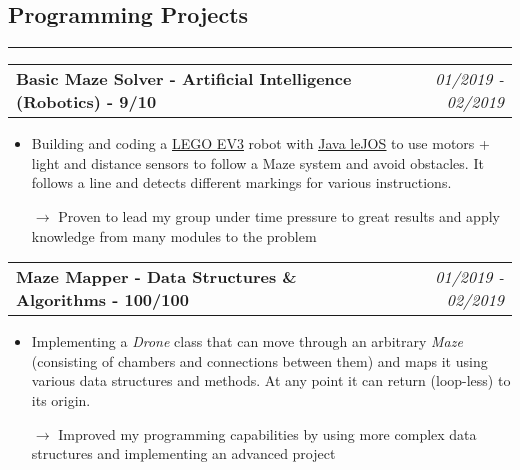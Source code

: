 \documentclass[10pt,letterpaper]{article}
\makeatletter
\newcommand{\headerrow}[2]
{\begin{tabular*}{\linewidth}{l@{\extracolsep{\fill}}r}
	#1 &
	#2 \\
\end{tabular*}}
\makeatother
\begin{document}
\subsection*{Programming Projects}
\hrule
\vspace{0.4em}

\noindent
\headerrow{\textbf{Basic Maze Solver - Artificial Intelligence (Robotics) - 9/10}}{\emph{01/2019 - 02/2019}}
\vspace{-1.6em}
\begin{itemize}
    \setlength\itemsep{0em}
    \item Building and coding a \href{https://www.lego.com/en-us/mindstorms/about-ev3}{\underline{LEGO EV3}} robot with \href{http://www.lejos.org}{\underline{Java leJOS}} to use motors + light and distance sensors to follow a Maze system and avoid obstacles. It follows a line and detects different markings for various instructions.
    \item[$\rightarrow$] Proven to lead my group under time pressure to great results and apply knowledge from many modules to the problem
\end{itemize}

\noindent
\headerrow{\textbf{Maze Mapper - Data Structures \& Algorithms - 100/100}}{\emph{01/2019 - 02/2019}}
\vspace{-1.6em}
\begin{itemize}
    \setlength\itemsep{0em}
    \item Implementing a \emph{Drone} class that can move through an arbitrary \emph{Maze} (consisting of chambers and connections between them) and maps it using various data structures and methods. At any point it can return (loop-less) to its origin.
    \item[$\rightarrow$] Improved my programming capabilities by using more complex data structures and implementing an advanced project
\end{itemize}
\vspace{0.4em}
\end{document}
